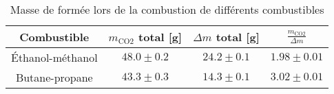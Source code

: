 \begin{table}[h]
    \centering
    \begin{tabulary}{\linewidth}{C C C C}
        \toprule
        Combustible & \(m_\textrm{CO2}\) total [\si{\gram}] & \(\Delta m\) total [\si{\gram}] & \(\frac{m_\textrm{CO2}}{\Delta m}\)\\
        \midrule
        Éthanol-méthanol & \(48.0 \pm 0.2\) & \(24.2 \pm 0.1\) & \(1.98 \pm 0.01\) \\
        Butane-propane & \(43.3 \pm 0.3\) & \(14.3 \pm 0.1\) & \(3.02 \pm 0.01\) \\
        \bottomrule
    \end{tabulary}
    \caption{Masse de  formée lors de la combustion de différents combustibles}
    \label{tab:masse_co2}
\end{table}
